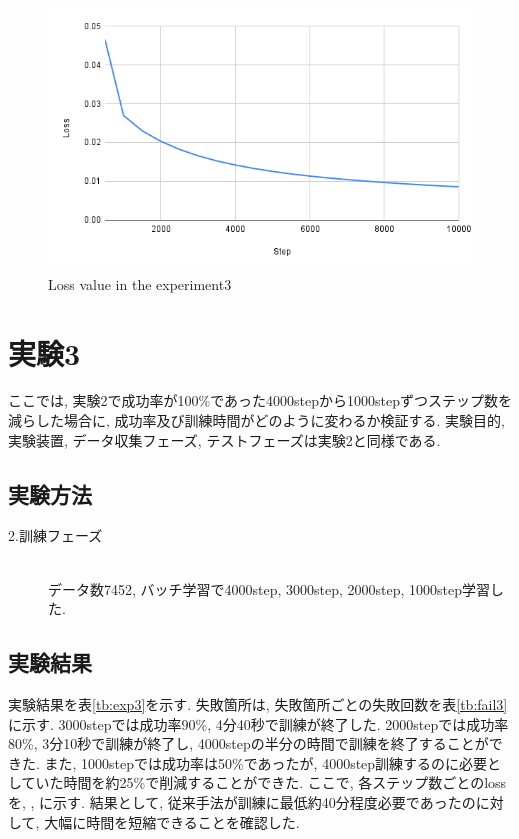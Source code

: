 \newpage
\begin{figure}[h]
  \centering
  \includegraphics[keepaspectratio, scale=0.5]{images/exp3_10000.png}
  \caption{Loss value in the experiment3}
  \label{Fig:exp2.2-10000}
  \end{figure}

\newpage
\section{実験3}
ここでは, 実験2で成功率が100\%であった4000stepから1000stepずつステップ数を減らした場合に, 成功率及び訓練時間がどのように変わるか検証する. 実験目的, 実験装置, データ収集フェーズ, テストフェーズは実験2と同様である. 

\subsection{実験方法}
\begin{description}
  \item[2.訓練フェーズ]\mbox{}\\データ数7452, バッチ学習で4000step, 3000step, 2000step, 1000step学習した. 
\end{description}

\subsection{実験結果}
実験結果を表\ref{tb:exp3}を示す. 失敗箇所は, 失敗箇所ごとの失敗回数を表\ref{tb:fail3}に示す. 3000stepでは成功率90\%, 4分40秒で訓練が終了した. 2000stepでは成功率80\%, 3分10秒で訓練が終了し, 4000stepの半分の時間で訓練を終了することができた. また, 1000stepでは成功率は50\%であったが, 4000step訓練するのに必要としていた時間を約25\%で削減することができた. ここで, 各ステップ数ごとのlossを, , に示す. 結果として, 従来手法が訓練に最低約40分程度必要であったのに対して, 大幅に時間を短縮できることを確認した. 

